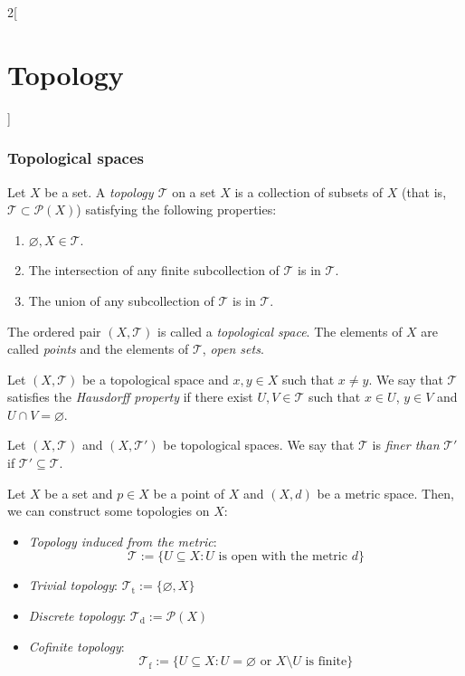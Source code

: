 \documentclass[../../../main.tex]{subfiles}
\begin{document}
\begin{multicols}{2}[\section{Topology}]
  \subsubsection{Topological spaces}
  \begin{definition}
    Let $X$ be a set. A \textit{topology $\mathcal{T}$} on a set $X$ is a collection of subsets of $X$ (that is, $\mathcal{T}\subset\mathcal{P}(X)$) satisfying the following properties:
    \begin{enumerate}
      \item $\varnothing, X\in\mathcal{T}$.
      \item The intersection of any finite subcollection of $\mathcal{T}$ is in $\mathcal{T}$.
      \item The union of any subcollection of $\mathcal{T}$ is in $\mathcal{T}$.
    \end{enumerate}
    The ordered pair $(X,\mathcal{T})$ is called a \textit{topological space}. The elements of $X$ are called \textit{points} and the elements of $\mathcal{T}$, \textit{open sets}.
  \end{definition}
  \begin{definition}
    Let $(X,\mathcal{T})$ be a topological space and $x,y\in X$ such that $x\ne y$. We say that $\mathcal{T}$ satisfies the \textit{Hausdorff property} if there exist $U,V\in\mathcal{T}$ such that $x\in U$, $y\in V$ and $U\cap V=\varnothing$.
  \end{definition}
  \begin{definition}
    Let $(X,\mathcal{T})$ and $(X,\mathcal{T}')$ be topological spaces. We say that $\mathcal{T}$ is \textit{finer than} $\mathcal{T}'$ if $\mathcal{T}'\subseteq\mathcal{T}$.
  \end{definition}
  \begin{prop}
    Let $X$ be a set and $p\in X$ be a point of $X$ and $(X,d)$ be a metric space. Then, we can construct some topologies on $X$:
    \begin{itemize}
      \item \textit{Topology induced from the metric}: $$\mathcal{T}:=\{U\subseteq X:U\text{ is open with the metric }d\}$$
      \item \textit{Trivial topology}: $\mathcal{T}_\text{t}:=\{\varnothing,X\}$
      \item \textit{Discrete topology}: $\mathcal{T}_\text{d}:=\mathcal{P}(X)$
      \item \textit{Cofinite topology}: $$\mathcal{T}_\text{f}:=\{U\subseteq X:U=\varnothing\text{ or }X\setminus U\text{ is finite}\}$$

\end{itemize}
\end{prop}
\end{multicols}
\end{document}
